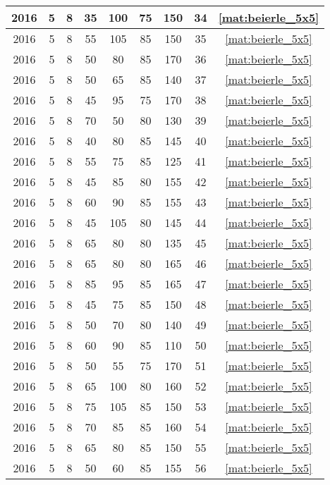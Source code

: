 \begin{longtable}{|c|c|c|c|c|c|c|c|c|}
2016 & 5 & 8 & 35 & 100 & 75 & 150 & 34 & \eqref{mat:beierle_5x5} \\ \hline 
2016 & 5 & 8 & 55 & 105 & 85 & 150 & 35 & \eqref{mat:beierle_5x5} \\ \hline 
2016 & 5 & 8 & 50 & 80 & 85 & 170 & 36 & \eqref{mat:beierle_5x5} \\ \hline 
2016 & 5 & 8 & 50 & 65 & 85 & 140 & 37 & \eqref{mat:beierle_5x5} \\ \hline 
2016 & 5 & 8 & 45 & 95 & 75 & 170 & 38 & \eqref{mat:beierle_5x5} \\ \hline 
2016 & 5 & 8 & 70 & 50 & 80 & 130 & 39 & \eqref{mat:beierle_5x5} \\ \hline 
2016 & 5 & 8 & 40 & 80 & 85 & 145 & 40 & \eqref{mat:beierle_5x5} \\ \hline 
2016 & 5 & 8 & 55 & 75 & 85 & 125 & 41 & \eqref{mat:beierle_5x5} \\ \hline 
2016 & 5 & 8 & 45 & 85 & 80 & 155 & 42 & \eqref{mat:beierle_5x5} \\ \hline 
2016 & 5 & 8 & 60 & 90 & 85 & 155 & 43 & \eqref{mat:beierle_5x5} \\ \hline 
2016 & 5 & 8 & 45 & 105 & 80 & 145 & 44 & \eqref{mat:beierle_5x5} \\ \hline 
2016 & 5 & 8 & 65 & 80 & 80 & 135 & 45 & \eqref{mat:beierle_5x5} \\ \hline 
2016 & 5 & 8 & 65 & 80 & 80 & 165 & 46 & \eqref{mat:beierle_5x5} \\ \hline 
2016 & 5 & 8 & 85 & 95 & 85 & 165 & 47 & \eqref{mat:beierle_5x5} \\ \hline 
2016 & 5 & 8 & 45 & 75 & 85 & 150 & 48 & \eqref{mat:beierle_5x5} \\ \hline 
2016 & 5 & 8 & 50 & 70 & 80 & 140 & 49 & \eqref{mat:beierle_5x5} \\ \hline 
2016 & 5 & 8 & 60 & 90 & 85 & 110 & 50 & \eqref{mat:beierle_5x5} \\ \hline 
2016 & 5 & 8 & 50 & 55 & 75 & 170 & 51 & \eqref{mat:beierle_5x5} \\ \hline 
2016 & 5 & 8 & 65 & 100 & 80 & 160 & 52 & \eqref{mat:beierle_5x5} \\ \hline 
2016 & 5 & 8 & 75 & 105 & 85 & 150 & 53 & \eqref{mat:beierle_5x5} \\ \hline 
2016 & 5 & 8 & 70 & 85 & 85 & 160 & 54 & \eqref{mat:beierle_5x5} \\ \hline 
2016 & 5 & 8 & 65 & 80 & 85 & 150 & 55 & \eqref{mat:beierle_5x5} \\ \hline 
2016 & 5 & 8 & 50 & 60 & 85 & 155 & 56 & \eqref{mat:beierle_5x5} \\ \hline 

\end{longtable}
